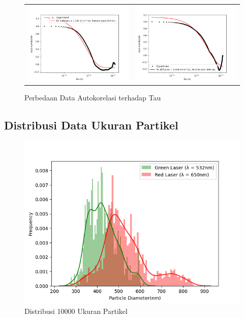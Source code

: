 \begin{figure}
  \ContinuedFloat
  \begin{longtable}{p{7cm}p{7cm}}
    \includegraphics[width=8cm]{Images/AutoCor_Hijau_Data1000-01.png}
    \centering{Laser Hijau}
    &
    \includegraphics[width=8cm]{Images/AutoCor_Merah_Data1000-01.png} 
    \centering{Laser Merah}\\
  \end{longtable}

  \caption{Perbedaan Data Autokorelasi terhadap Tau}
\end{figure}

\subsection{Distribusi Data Ukuran Partikel}
\begin{figure}[H]
  \centering
  \includegraphics[width=13cm]{Images/Distribusi 10000x.png}
  \caption{Distribusi 10000 Ukuran Partikel}
  \label{fig:dist10000x}
\end{figure}

